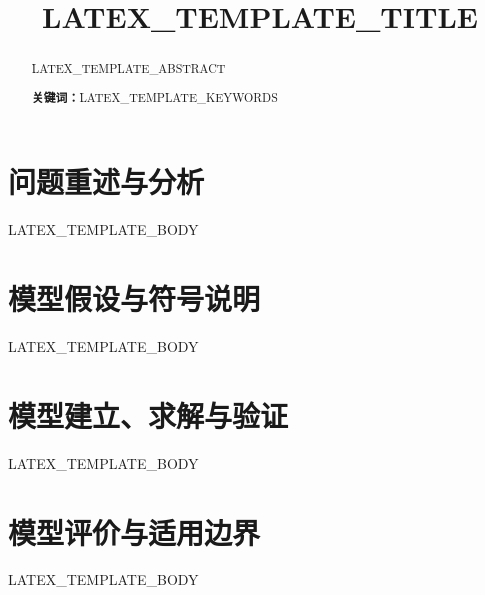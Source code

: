 \documentclass[UTF8,12pt,a4paper]{ctexart}
\title{LATEX_TEMPLATE_TITLE}
\author{}
\date{}
\newcommand{\keywords}[1]{\par\noindent\textbf{关键词：}#1}
\begin{document}
\maketitle

\begin{abstract}
LATEX_TEMPLATE_ABSTRACT
\keywords{LATEX_TEMPLATE_KEYWORDS}
\end{abstract}

\section{问题重述与分析}
LATEX_TEMPLATE_BODY

\section{模型假设与符号说明}
LATEX_TEMPLATE_BODY

\section{模型建立、求解与验证}
LATEX_TEMPLATE_BODY

\section{模型评价与适用边界}
LATEX_TEMPLATE_BODY



\end{document}
